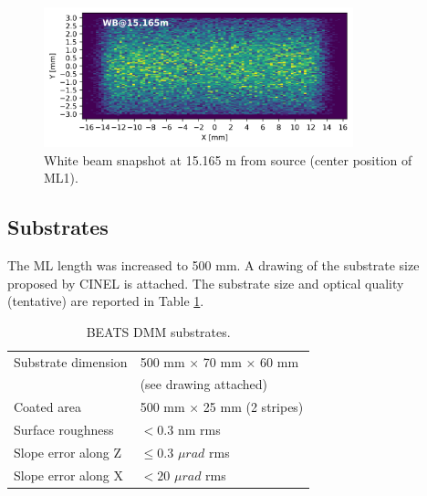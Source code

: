 \setlength{\belowcaptionskip}{-15pt}
\vspace*{-\baselineskip}

\begin{figure} [!ht]
\centering
\includegraphics[width=0.8\textwidth]{./../../beam_snapshots/WB_snapshot_15.165.png}
\caption{\label{fig:snapshot_ML1} White beam snapshot at 15.165 m from source (center position of ML1).}
\end{figure}
\setlength{\belowcaptionskip}{-15pt}

\clearpage
\subsection{Substrates}
The ML length was increased to 500 mm. A drawing of the substrate size proposed by CINEL is attached. The substrate size and optical quality (tentative) are reported in Table \ref{tab:substrates}.

\begin{center}
\begin{table} [ht]
\begin{tabular}[bhp]{|p{} | p{}|}
\hline
Substrate dimension & 500 mm × 70 mm × 60 mm \\
 & (see drawing attached) \\
\hline
Coated area & 500 mm × 25 mm (2 stripes) \\
\hline
Surface roughness & $< 0.3$ nm rms \\
\hline
Slope error along Z & $\leq 0.3$ $\mu rad$ rms \\
\hline
Slope error along X & $< 20$ $\mu rad$ rms \\
\hline
\end{tabular}
\caption{\label{tab:substrates} BEATS DMM substrates.}
\end{table}
\end{center}

